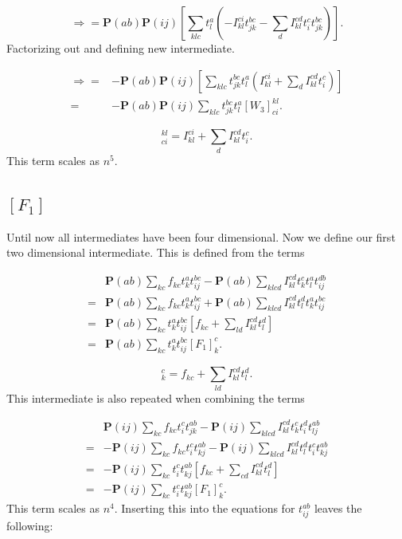 \documentclass[a4paper,norsk,11pt,twoside]{report}
\begin{document}
\begin{equation}
\Rightarrow =
\textbf{P}(ab) \textbf{P}(ij) \left[ \sum_{klc} t_l^a \left(
- I_{kl}^{ci} t_{jk}^{bc} - \sum_d I_{kl}^{cd} t_i^c t_{jk}^{bc} \right) \right] .
\end{equation}
Factorizing out and defining new intermediate.

\begin{align}
\Rightarrow = &
- \textbf{P}(ab) \textbf{P}(ij) \left[ \sum_{klc} t_{jk}^{bc} t_l^a \left(
 I_{kl}^{ci} + \sum_d I_{kl}^{cd} t_i^c \right) \right] \nonumber \\
= &
- \textbf{P}(ab) \textbf{P}(ij) \sum_{klc}
t_{jk}^{bc} t_l^a
 [W_3]_{ci}^{kl} .
\end{align}

\begin{equation}
[W_3]_{ci}^{kl} = I_{kl}^{ci} + \sum_d I_{kl}^{cd} t_i^c  . \label{intermedW3}
\end{equation}
This term scales as $n^5$.

\subsection{$[F_1]$}
Until now all intermediates have been four dimensional. Now we define our first two dimensional intermediate. This is defined from the terms

\begin{align}
& \textbf{P}(ab) \sum_{kc} f_{kc} t_k^a t_{ij}^{bc}
- \textbf{P}(ab) \sum_{klcd} I_{kl}^{cd} t_k^c t_l^a t_{ij}^{db} \nonumber \\ 
= & 
\textbf{P}(ab) \sum_{kc} f_{kc} t_k^a t_{ij}^{bc}
+ \textbf{P}(ab) \sum_{klcd} I_{kl}^{cd} t_l^d t_k^a t_{ij}^{bc} \nonumber \\
= &
\textbf{P}(ab) \sum_{kc} t_k^a t_{ij}^{bc} \left[ f_{kc} + \sum_{ld} I_{kl}^{cd} t_l^d \right] \nonumber \\
= &
\textbf{P}(ab) \sum_{kc} t_k^a t_{ij}^{bc} [F_1]_k^c .
\end{align}

\begin{equation}
[F_1]_k^c = f_{kc} + \sum_{ld} I_{kl}^{cd} t_l^d . \label{intermedF1}
\end{equation}
This intermediate is also repeated when combining the terms

\begin{align}
& \textbf{P}(ij) \sum_{kc} f_{kc} t_i^c t_{jk}^{ab}
- \textbf{P}(ij) \sum_{klcd} I_{kl}^{cd} t_k^c t_i^d t_{lj}^{ab} \nonumber \\ 
= &
- \textbf{P}(ij) \sum_{kc} f_{kc} t_i^c t_{kj}^{ab}
- \textbf{P}(ij) \sum_{klcd} I_{kl}^{cd} t_l^d t_i^c t_{kj}^{ab} \nonumber \\
= &
- \textbf{P}(ij) \sum_{kc} t_i^c t_{kj}^{ab} \left[
f_{kc} + \sum_{cd} I_{kl}^{cd} t_l^d \right] \nonumber \\ 
= &
- \textbf{P}(ij) \sum_{kc} t_i^c t_{kj}^{ab} [F_1]_k^c
.
\end{align}
This term scales as $n^4$. Inserting this into the equations for $t_{ij}^{ab}$ leaves the following:
\end{document}
